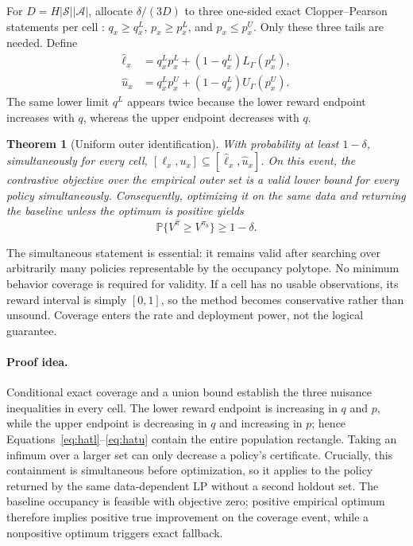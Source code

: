 \documentclass[letterpaper]{article}
\newtheorem{theorem}{Theorem}
\theoremstyle{remark}
\newcommand{\Prb}{\mathbb{P}}
\newcommand{\cS}{\mathcal{S}}
\newcommand{\cA}{\mathcal{A}}
\begin{document}
For $D=H|\cS||\cA|$, allocate $\delta/(3D)$ to three one-sided exact Clopper--Pearson statements per cell \citep{clopper1934fiducial}: $q_x\geq q_x^L$, $p_x\geq p_x^L$, and $p_x\leq p_x^U$. Only these three tails are needed. Define
\begin{align}
\widehat\ell_x&=q_x^Lp_x^L+(1-q_x^L)L_\Gamma(p_x^L),\label{eq:hatl}\\
\widehat u_x&=q_x^Lp_x^U+(1-q_x^L)U_\Gamma(p_x^U).\label{eq:hatu}
\end{align}
The same lower limit $q^L$ appears twice because the lower reward endpoint increases with $q$, whereas the upper endpoint decreases with $q$.

\begin{theorem}[Uniform outer identification]\label{thm:finite}
With probability at least $1-\delta$, simultaneously for every cell,
$[\ell_x,u_x]\subseteq[\widehat\ell_x,\widehat u_x]$.
On this event, the contrastive objective over the empirical outer set is a valid lower bound for every policy simultaneously. Consequently, optimizing it on the same data and returning the baseline unless the optimum is positive yields
\[
\Prb\{V^{\widehat\pi}\geq V^{\pi_b}\}\geq1-\delta.
\]
\end{theorem}

The simultaneous statement is essential: it remains valid after searching over arbitrarily many policies representable by the occupancy polytope. No minimum behavior coverage is required for validity. If a cell has no usable observations, its reward interval is simply $[0,1]$, so the method becomes conservative rather than unsound. Coverage enters the rate and deployment power, not the logical guarantee.

\paragraph{Proof idea.}
Conditional exact coverage and a union bound establish the three nuisance inequalities in every cell. The lower reward endpoint is increasing in $q$ and $p$, while the upper endpoint is decreasing in $q$ and increasing in $p$; hence Equations~\eqref{eq:hatl}--\eqref{eq:hatu} contain the entire population rectangle. Taking an infimum over a larger set can only decrease a policy's certificate. Crucially, this containment is simultaneous before optimization, so it applies to the policy returned by the same data-dependent LP without a second holdout set. The baseline occupancy is feasible with objective zero; positive empirical optimum therefore implies positive true improvement on the coverage event, while a nonpositive optimum triggers exact fallback.
\end{document}
